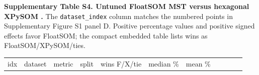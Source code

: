 \documentclass[
]{article}
\newcounter{none} %
\providecommand{\DIFadd}[1]{{\protect\color{blue} #1}} %
\providecommand{\DIFaddbegin}{} %
\providecommand{\DIFaddend}{} %
\begin{document}
\textbf{Supplementary Table S4. \DIFaddbegin \DIFadd{Untuned }\DIFaddend FloatSOM \DIFaddbegin \DIFadd{MST }\DIFaddend versus \DIFaddbegin \DIFadd{hexagonal
}\DIFaddend XPySOM .} The \texttt{dataset\_index} column matches the numbered points
in Supplementary Figure S1 panel D.  \DIFaddbegin \DIFadd{Positive percentage values and
positive signed effects favor FloatSOM; the compact embedded table lists
wins as FloatSOM/XPySOM/ties}\DIFaddend .

\DIFaddbegin {\def\LTcaptype{none} %
\begin{longtable}[]{@{}
  >{\raggedright\arraybackslash}p{}
  >{\raggedright\arraybackslash}p{}
  >{\raggedright\arraybackslash}p{}
  >{\raggedright\arraybackslash}p{}
  >{\raggedright\arraybackslash}p{}
  >{\raggedright\arraybackslash}p{}
  >{\raggedright\arraybackslash}p{}
  >{\raggedright\arraybackslash}p{}
  >{\raggedright\arraybackslash}p{}
  >{\raggedright\arraybackslash}p{}
  >{\raggedright\arraybackslash}p{}@{}}
\toprule\noalign{}
\begin{minipage}[b]{\linewidth}\raggedright
\DIFadd{idx
}\end{minipage} & \begin{minipage}[b]{\linewidth}\raggedright
\DIFadd{dataset
}\end{minipage} & \begin{minipage}[b]{\linewidth}\raggedright
\DIFadd{metric
}\end{minipage} & \begin{minipage}[b]{\linewidth}\raggedright
\DIFadd{split
}\end{minipage} & \begin{minipage}[b]{\linewidth}\raggedright
\DIFadd{wins F/X/tie
}\end{minipage} & \begin{minipage}[b]{\linewidth}\raggedright
\DIFadd{median \%
}\end{minipage} & \begin{minipage}[b]{\linewidth}\raggedright
\DIFadd{mean \%
}\end{minipage} & \begin{minipage}[b]{\linewidth}\raggedright

\end{minipage}
\end{longtable}}
\end{document}
